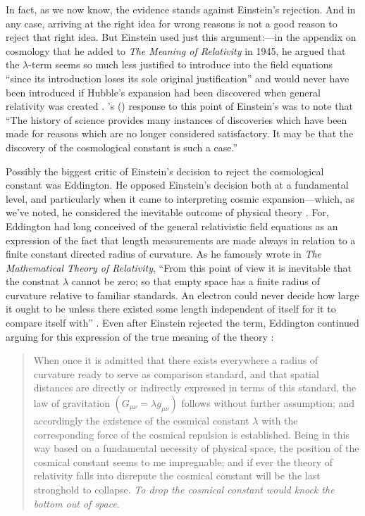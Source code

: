 \documentclass[12 pt]{article}
\def\citeapos#1{\citeauthor{#1}'s (\citeyear{#1})}
\begin{document}
In fact, as we now know, the evidence stands against Einstein's rejection. And in any case, arriving at the right idea for wrong reasons is not a good reason to reject that right idea. But Einstein used just this argument:---in the appendix on cosmology that he added to \textit{The Meaning of Relativity} in 1945, he argued that the $\lambda$-term seems so much less justified to introduce into the field equations ``since its introduction loses its sole original justification'' and would never have been introduced if Hubble's expansion had been discovered when general relativity was created \citep{Einstein1945}. \citeapos{Lemaitre1949a} response to this point of Einstein's was to note that ``The history of science provides many instances of discoveries which have been made for reasons which are no longer considered satisfactory. It may be that the discovery of the cosmological constant is such a case.''

Possibly the biggest critic of Einstein's decision to reject the cosmological constant was Eddington. He opposed Einstein's decision both at a fundamental level, and particularly when it came to interpreting cosmic expansion---which, as we've noted, he considered the inevitable outcome of physical theory \citep{Eddington1933}. For, Eddington had long conceived of the general relativistic field equations as an expression of the fact that length measurements are made always in relation to a finite constant directed radius of curvature. As he famously wrote in \textit{The Mathematical Theory of Relativity}, ``From this point of view it is inevitable that the constnat $\lambda$ cannot be zero; so that empty space has a finite radius of curvature relative to familiar standards. An electron could never decide how large it ought to be unless there existed some length independent of itself for it to compare itself with'' \citep{Eddington1923}. Even after Einstein rejected the term, Eddington continued arguing for this expression of the true meaning of the theory \citep{Eddington1933}:
\begin{quotation}
When once it is admitted that there exists everywhere a radius of curvature ready to serve as comparison standard, and that spatial distances are directly or indirectly expressed in terms of this standard, the law of gravitation $(G_{\mu\nu}=\lambda{g_{\mu\nu}})$ follows without further assumption; and accordingly the existence of the cosmical constant $\lambda$ with the corresponding force of the cosmical repulsion is established. Being in this way based on a fundamental necessity of physical space, the position of the cosmical constant seems to me impregnable; and if ever the theory of relativity falls into disrepute the cosmical constant will be the last stronghold to collapse. \textit{To drop the cosmical constant would knock the bottom out of space}.
\end{quotation}
\end{document}
